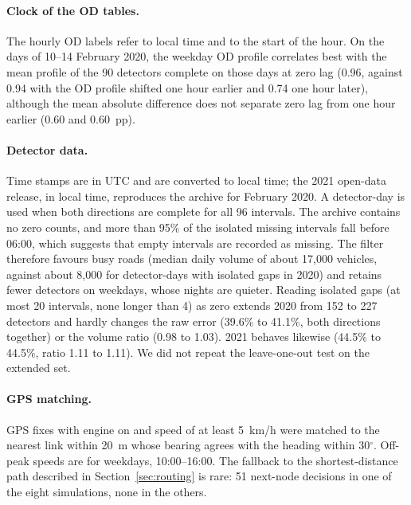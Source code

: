 \documentclass[11pt,a4paper]{article}
\begin{document}
\paragraph{Clock of the OD tables.} The hourly OD labels refer to local time and to the start of the hour. On the days of 10--14 February 2020, the weekday OD profile correlates best with the mean profile of the 90 detectors complete on those days at zero lag (0.96, against 0.94 with the OD profile shifted one hour earlier and 0.74 one hour later), although the mean absolute difference does not separate zero lag from one hour earlier (0.60 and 0.60~pp).

\paragraph{Detector data.} Time stamps are in UTC and are converted to local time; the 2021 open-data release, in local time, reproduces the archive for February 2020. A detector-day is used when both directions are complete for all 96 intervals. The archive contains no zero counts, and more than 95\% of the isolated missing intervals fall before 06:00, which suggests that empty intervals are recorded as missing. The filter therefore favours busy roads (median daily volume of about 17,000 vehicles, against about 8,000 for detector-days with isolated gaps in 2020) and retains fewer detectors on weekdays, whose nights are quieter. Reading isolated gaps (at most 20 intervals, none longer than 4) as zero extends 2020 from 152 to 227 detectors and hardly changes the raw error (39.6\% to 41.1\%, both directions together) or the volume ratio (0.98 to 1.03). 2021 behaves likewise (44.5\% to 44.5\%, ratio 1.11 to 1.11). We did not repeat the leave-one-out test on the extended set.

\paragraph{GPS matching.} GPS fixes with engine on and speed of at least 5~km/h were matched to the nearest link within 20~m whose bearing agrees with the heading within 30$^\circ$. Off-peak speeds are for weekdays, 10:00--16:00. The fallback to the shortest-distance path described in Section~\ref{sec:routing} is rare: 51 next-node decisions in one of the eight simulations, none in the others.
\end{document}
